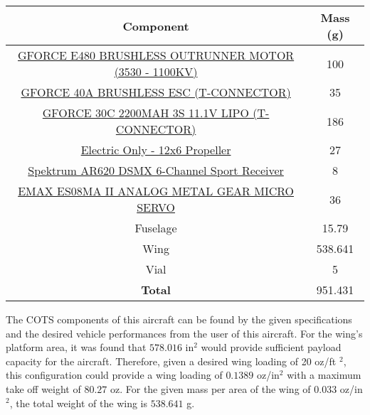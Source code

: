     \begin{table}[H]
        \begin{tabular}{|c|c| } %
            \hline \textbf{Component} & \textbf{Mass (g)} \\ \hline %
            \href{https://www.amazon.com/Brushless-Outrunner-Multicopters-Helicopter-Control/dp/B08MKQFSVF/ref=asc_df_B08MKQFSVF/?tag=hyprod-20&linkCode=df0&hvadid=475795164185&hvpos=&hvnetw=g&hvrand=9902342740412303481&hvpone=&hvptwo=&hvqmt=&hvdev=c&hvdvcmdl=&hvlocint=&hvlocphy=2840&hvtargid=pla-1195392311214&th=1}{GFORCE E480 BRUSHLESS OUTRUNNER MOTOR (3530 - 1100KV)} & 100 \\ \hline
            \href{http://www.valuehobby.com/gforce-40a-esc.html}{GFORCE 40A BRUSHLESS ESC (T-CONNECTOR)} & 35 \\ \hline
            \href{http://www.valuehobby.com/30c-2200mah-3s-t.html}{GFORCE 30C 2200MAH 3S 11.1V LIPO (T-CONNECTOR)} & 186 \\ \hline
            \href{https://www.masterairscrew.com/products/electric-only-12x6-propeller?currency=USD&utm_medium=cpc&utm_source=google&utm_campaign=Google\%20Shopping&gclid=CjwKCAiA9aKQBhBREiwAyGP5laqPgb8z2BGon5sD8qHYRZQVab7IcA0DZg8DOcFMsDTccBgRqirzgBoC1wkQAvD_BwE}{Electric Only - 12x6 Propeller} & 27 \\ \hline
            \href{https://www.horizonhobby.com/product/ar620-dsmx-6-channel-sport-receiver/SPMAR620.html?gclid=CjwKCAiA9aKQBhBREiwAyGP5lX6-hyQKl87DI0WH0pgWG2HS0woZKcd-L2bMRS_qWmVI1fLqpeCX0BoCrRAQAvD_BwE}{Spektrum AR620 DSMX 6-Channel Sport Receiver} & 8 \\ \hline
            \href{https://arrishobby.com/emax-es08ma-ii-12g-mini-metal-gear-analog-servo-p0842.html?VariantsId=12700}{EMAX ES08MA II ANALOG METAL GEAR MICRO SERVO} & 36 \\ \hline
            Fuselage  & 15.79  \\ \hline
            Wing & 538.641 \\ \hline
            Vial & 5 \\ \hline
            \textbf{Total} & 951.431 \\ \hline
        \end{tabular}
        \end{table}
        
        The COTS components of this aircraft can be found by the given specifications and the desired vehicle performances from the user of this aircraft. For the wing's platform area, it was found that $578.016$ in$^2$ would provide sufficient payload capacity for the aircraft. Therefore, given a desired wing loading of 20 oz/ft $^2$, this configuration could provide a wing loading of $0.1389$ oz/in$^2$ with a maximum take off weight of $80.27$ oz. For the given mass per area of the wing of 0.033 oz/in$^2$, the total weight of the wing is $538.641$ g. 
        
